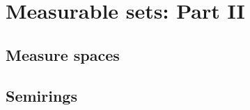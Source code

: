\chapter{Measurable sets: Part II}%
\label{cha:Measurable sets: Part II}
\section{Measure spaces}%
\label{sec:Measure spaces}
\section{Semirings}%
\label{sec:Semirings}

